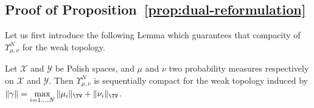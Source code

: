 \subsection{Proof of Proposition~\ref{prop:dual-reformulation}}
\begin{prv*}
\label{prv:dual-reformulation}
Let us first introduce the following Lemma which guarantees that compacity of  $\Upsilon^N_{\mu,\nu}$ for the weak topology.
\begin{lemma}
\label{lemma:weak-topo-dual-dual}
Let $\mathcal{X}$ and $\mathcal{Y}$ be Polish spaces, and $\mu$ and $\nu$ two probability measures respectively on  $\mathcal{X}$ and $\mathcal{Y}$. Then $\Upsilon^N_{\mu,\nu}$  is sequentially compact for the weak topology induced by $\Vert \gamma \Vert = \max\limits_{i=1,..,N} \Vert \mu_i\Vert_{\TV} + \Vert \nu_i\Vert_{\TV} $. 
\end{lemma}



\end{prv*}

